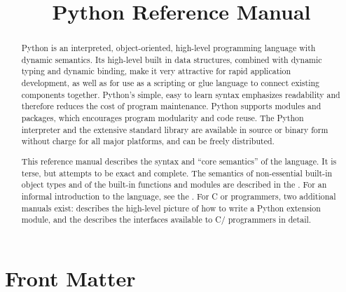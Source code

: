 \documentclass{manual}
\title{Python Reference Manual}
\begin{document}
\maketitle

\ifhtml
\chapter*{Front Matter\label{front}}
\fi



\begin{abstract}

\noindent
Python is an interpreted, object-oriented, high-level programming
language with dynamic semantics.  Its high-level built in data
structures, combined with dynamic typing and dynamic binding, make it
very attractive for rapid application development, as well as for use
as a scripting or glue language to connect existing components
together.  Python's simple, easy to learn syntax emphasizes
readability and therefore reduces the cost of program
maintenance.  Python supports modules and packages, which encourages
program modularity and code reuse.  The Python interpreter and the
extensive standard library are available in source or binary form
without charge for all major platforms, and can be freely distributed.

This reference manual describes the syntax and ``core semantics'' of
the language.  It is terse, but attempts to be exact and complete.
The semantics of non-essential built-in object types and of the
built-in functions and modules are described in the
.  For an
informal introduction to the language, see the
.  For C or
\Cpp{} programmers, two additional manuals exist:
 describes the high-level picture of how to write a Python
extension module, and the  describes the interfaces available to
C/\Cpp{} programmers in detail.

\end{abstract}

\tableofcontents


\appendix


\end{document}
